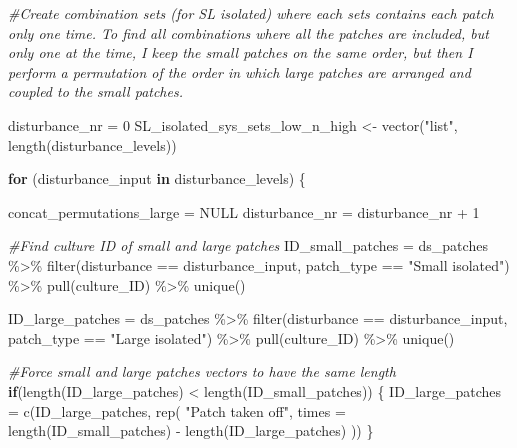 \documentclass[
]{article}
\newenvironment{Shaded}{\begin{snugshade}}{\end{snugshade}}
\newcommand{\AttributeTok}[1]{\textcolor[rgb]{0.77,0.63,0.00}{#1}}
\newcommand{\CommentTok}[1]{\textcolor[rgb]{0.56,0.35,0.01}{\textit{#1}}}
\newcommand{\ConstantTok}[1]{\textcolor[rgb]{0.00,0.00,0.00}{#1}}
\newcommand{\ControlFlowTok}[1]{\textcolor[rgb]{0.13,0.29,0.53}{\textbf{#1}}}
\newcommand{\DecValTok}[1]{\textcolor[rgb]{0.00,0.00,0.81}{#1}}
\newcommand{\FunctionTok}[1]{\textcolor[rgb]{0.00,0.00,0.00}{#1}}
\newcommand{\NormalTok}[1]{#1}
\newcommand{\OtherTok}[1]{\textcolor[rgb]{0.56,0.35,0.01}{#1}}
\newcommand{\SpecialCharTok}[1]{\textcolor[rgb]{0.00,0.00,0.00}{#1}}
\newcommand{\StringTok}[1]{\textcolor[rgb]{0.31,0.60,0.02}{#1}}
\begin{document}
\begin{Shaded}
\begin{Highlighting}[]
\CommentTok{\#Create combination sets (for SL isolated) where each sets contains each patch only one time. To find all combinations where all the patches are included, but only one at the time, I keep the small patches on the same order, but then I perform a permutation of the order in which large patches are arranged and coupled to the small patches. }

\NormalTok{disturbance\_nr }\OtherTok{=} \DecValTok{0}
\NormalTok{SL\_isolated\_sys\_sets\_low\_n\_high }\OtherTok{\textless{}{-}} \FunctionTok{vector}\NormalTok{(}\StringTok{"list"}\NormalTok{, }
                               \FunctionTok{length}\NormalTok{(disturbance\_levels))}

\ControlFlowTok{for}\NormalTok{ (disturbance\_input }\ControlFlowTok{in}\NormalTok{ disturbance\_levels) \{}
  
\NormalTok{  concat\_permutations\_large }\OtherTok{=} \ConstantTok{NULL}
\NormalTok{  disturbance\_nr }\OtherTok{=}\NormalTok{ disturbance\_nr }\SpecialCharTok{+} \DecValTok{1}
  
  \CommentTok{\#Find culture ID of small and large patches}
\NormalTok{  ID\_small\_patches }\OtherTok{=}\NormalTok{ ds\_patches }\SpecialCharTok{\%\textgreater{}\%}
    \FunctionTok{filter}\NormalTok{(disturbance }\SpecialCharTok{==}\NormalTok{ disturbance\_input,}
\NormalTok{           patch\_type }\SpecialCharTok{==} \StringTok{"Small isolated"}\NormalTok{) }\SpecialCharTok{\%\textgreater{}\%}
    \FunctionTok{pull}\NormalTok{(culture\_ID) }\SpecialCharTok{\%\textgreater{}\%}
    \FunctionTok{unique}\NormalTok{()}
  
\NormalTok{  ID\_large\_patches }\OtherTok{=}\NormalTok{ ds\_patches }\SpecialCharTok{\%\textgreater{}\%}
    \FunctionTok{filter}\NormalTok{(disturbance }\SpecialCharTok{==}\NormalTok{ disturbance\_input,}
\NormalTok{           patch\_type }\SpecialCharTok{==} \StringTok{"Large isolated"}\NormalTok{) }\SpecialCharTok{\%\textgreater{}\%}
    \FunctionTok{pull}\NormalTok{(culture\_ID) }\SpecialCharTok{\%\textgreater{}\%}
    \FunctionTok{unique}\NormalTok{()}
  
  \CommentTok{\#Force small and large patches vectors to have the same length }
  \ControlFlowTok{if}\NormalTok{(}\FunctionTok{length}\NormalTok{(ID\_large\_patches) }\SpecialCharTok{\textless{}} \FunctionTok{length}\NormalTok{(ID\_small\_patches)) \{}
\NormalTok{    ID\_large\_patches }\OtherTok{=} \FunctionTok{c}\NormalTok{(ID\_large\_patches,}
                         \FunctionTok{rep}\NormalTok{(}
                           \StringTok{"Patch taken off"}\NormalTok{,}
                           \AttributeTok{times =} \FunctionTok{length}\NormalTok{(ID\_small\_patches) }\SpecialCharTok{{-}} \FunctionTok{length}\NormalTok{(ID\_large\_patches)}
\NormalTok{                         ))}
\NormalTok{  \}}
  

\end{Highlighting}
\end{Shaded}
\end{document}
